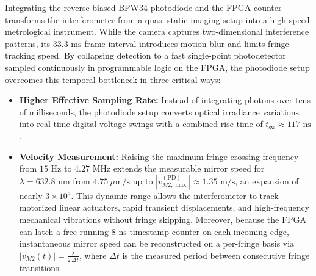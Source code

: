 Integrating the reverse-biased BPW34 photodiode and the FPGA counter transforms the interferometer from a quasi-static imaging setup into a high-speed metrological instrument. While the camera captures two-dimensional interference patterns, its $33.3\text{ ms}$ frame interval introduces motion blur and limits fringe tracking speed. By collapsing detection to a fast single-point photodetector sampled continuously in programmable logic on the FPGA, the photodiode setup overcomes this temporal bottleneck in three critical ways:

\begin{itemize}
    \item \textbf{Higher Effective Sampling Rate:}
    Instead of integrating photons over tens of milliseconds, the photodiode setup converts optical irradiance variations into real-time digital voltage swings with a combined rise time of $t_{\text{sw}} \approx 117\text{ ns}$.

    \item \textbf{Velocity Measurement:}
    Raising the maximum fringe-crossing frequency from $15\text{ Hz}$ to $4.27\text{ MHz}$ extends the measurable mirror speed for $\lambda = 632.8\text{ nm}$ from $4.75\ \mu\text{m/s}$ up to $|v_{M2, \max}^{(\text{PD})}| \approx 1.35\text{ m/s}$, an expansion of nearly $3 \times 10^5$. This dynamic range allows the interferometer to track motorized linear actuators, rapid transient displacements, and high-frequency mechanical vibrations without fringe skipping. Moreover, because the FPGA can latch a free-running $8\text{ ns}$ timestamp counter on each incoming edge, instantaneous mirror speed can be reconstructed on a per-fringe basis via $|v_{M2}(t)| = \frac{\lambda}{2\,\Delta t}$, where $\Delta t$ is the measured period between consecutive fringe transitions.


\end{itemize}
